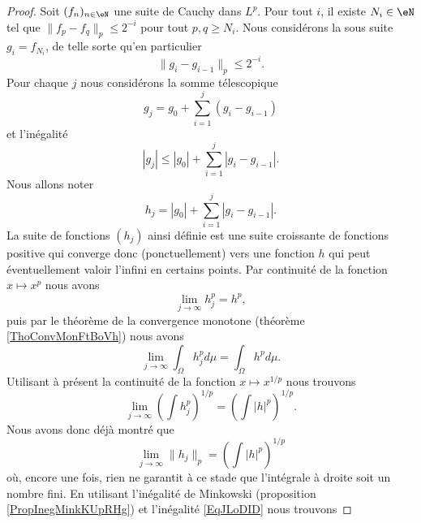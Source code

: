 \begin{proof}
    Soit \( (f_n)_{n\in\eN}\) une suite de Cauchy dans \( L^p\). Pour tout \( i\), il existe \( N_i\in\eN\) tel que $\| f_p-f_q \|_p\leq 2^{-i}$ pour tout \( p,q\geq N_i\). Nous considérons la sous suite \( g_i=f_{N_i}\), de telle sorte qu'en particulier
    \begin{equation}    \label{EqJLoDID}
        \|g_i-g_{i-1}\|_p\leq 2^{-i}.
    \end{equation}
    Pour chaque \( j\) nous considérons la somme télescopique
    \begin{equation}
        g_j=g_0+\sum_{i=1}^j(g_i-g_{i-1})
    \end{equation}
    et l'inégalité
    \begin{equation}
        | g_j |\leq | g_0 |+\sum_{i=1}^j| g_i-g_{i-1} |.
    \end{equation}
    Nous allons noter
    \begin{equation}        \label{EqSomPaFPQOWC}
        h_j=| g_0 |+\sum_{i=1}^j| g_i-g_{i-1} |.
    \end{equation}
    La suite de fonctions \( (h_j)\) ainsi définie est une suite croissante de fonctions positive qui converge donc (ponctuellement) vers une fonction \( h\) qui peut éventuellement valoir l'infini en certains points. Par continuité de la fonction \( x\mapsto x^p\) nous avons
    \begin{equation}
        \lim_{j\to \infty} h_j^p=h^p,
    \end{equation}
    puis par le théorème de la convergence monotone (théorème \ref{ThoConvMonFtBoVh}) nous avons
    \begin{equation}
        \lim_{j\to \infty} \int_{\Omega}h_j^pd\mu=\int_{\Omega}h^pd\mu.
    \end{equation}
    Utilisant à présent la continuité de la fonction \( x\mapsto x^{1/p}\) nous trouvons
    \begin{equation}
        \lim_{j\to \infty} \left( \int h_j^p \right)^{1/p}=\left( \int | h |^p \right)^{1/p}.
    \end{equation}
    Nous avons donc déjà montré que
    \begin{equation}
        \lim_{j\to \infty} \| h_j \|_p=\left( \int | h |^p \right)^{1/p}
    \end{equation}
    où, encore une fois, rien ne garantit à ce stade que l'intégrale à droite soit un nombre fini. En utilisant l'inégalité de Minkowski (proposition \ref{PropInegMinkKUpRHg}) et l'inégalité \eqref{EqJLoDID} nous trouvons

\end{proof}
